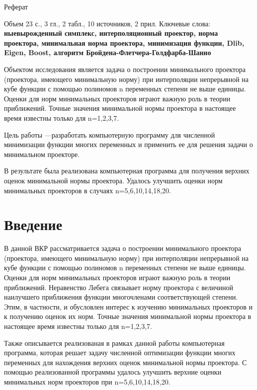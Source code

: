 \documentclass[12pt, a4paper]{extarticle}
\begin{document}
 
\justify 
\setlength{\parindent}{1.25cm} 
\newpage 
\thispagestyle{empty} 
\setcounter{page}{2} 
\begin{center}
Реферат
\end{center}

Объем 23 с., 3 гл., 2 табл., 10 источников, 2 прил.\newline
Ключевые слова: {\bf ныевырожденный симплекс, интерполяционный проектор, норма проектора, минимальная норма проектора, минимизация функции, Dlib, Eigen, Boost, алгоритм Бройдена-Флетчера-Голдфарба-Шанно}

Объектом исследования является задача о построении минимального проектора (проектора, имеющего минимальную норму) при интерполяции непрерывной на кубе функции с помощью полиномов n переменных степени не выше единицы. Оценки для норм минимальных проекторов играют важную роль в теории приближений.  Точные значения минимальной нормы проектора в настоящее время известны только для n=1,2,3,7.

Цель работы ---разработать компьютерную программу для численной минимизации функции многих переменных и применить ее для решения задачи о минимальном проекторе.

В результате была реализована компьютерная программа для получения верхних оценок минимальной нормы проектора. Удалось улучшить оценки норм минимальных проекторов в случаях n=5,6,10,14,18,20.

\newpage 
\tableofcontents 
\newpage 
\section*{Введение} 

В данной ВКР рассматривается задача о построении минимального проектора (проектора, имеющего минимальную норму) при интерполяции непрерывной на кубе функции с помощью полиномов n переменных степени не выше единицы. Оценки для норм минимальных проекторов играют важную роль в теории приближений. Неравенство Лебега связывает норму проектора с величиной наилучшего приближения функции многочленами соответствующей степени. Этим, в частности, и обусловлен интерес к изучению минимальных проекторов и к получению оценок их норм. Точные значения минимальной нормы проектора в настоящее время известны только для n=1,2,3,7.

Также описывается реализованая в рамках данной работы компьютерная программа, которая решает задачу численной оптимизации функции многих переменных для нахождения верхних оценок минимальной нормы проектора. С помощью реализованной программы удалось улучшить верхние оценки минимальных норм проекторов при n=5,6,10,14,18,20.
\end{document}
